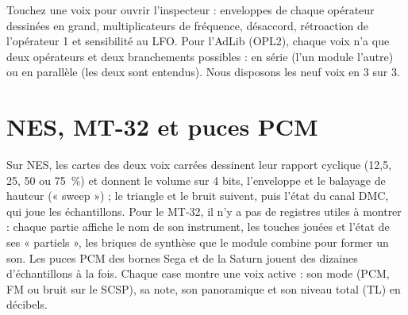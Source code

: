 Touchez une voix pour ouvrir l'inspecteur : enveloppes de chaque opérateur dessinées en grand, multiplicateurs de
fréquence, désaccord, rétroaction de l'opérateur 1 et sensibilité au LFO.
Pour l'AdLib (OPL2), chaque voix n'a que deux opérateurs et deux branchements possibles : en série (l'un module
l'autre) ou en parallèle (les deux sont entendus). Nous disposons les neuf voix en 3 sur 3.

\section{NES, MT-32 et puces PCM}
Sur NES, les cartes des deux voix carrées dessinent leur rapport cyclique (12,5, 25, 50 ou 75~\%) et donnent le
volume sur 4 bits, l'enveloppe et le balayage de hauteur (« sweep ») ; le triangle et le bruit suivent, puis l'état
du canal DMC, qui joue les échantillons. Pour le MT-32, il n'y a pas de registres utiles à montrer : chaque partie
affiche le nom de son instrument, les touches jouées et l'état de ses « partiels », les briques de synthèse que le
module combine pour former un son.
Les puces PCM des bornes Sega et de la Saturn jouent des dizaines d'échantillons à la fois. Chaque case montre une
voix active : son mode (PCM, FM ou bruit sur le SCSP), sa note, son panoramique et son niveau total (TL) en décibels.
